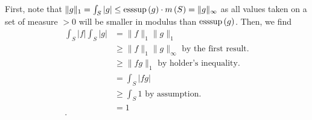 \documentclass[a4paper]{article}
\begin{document}
\newpage
\begin{problem}[41]
First, note that \(\|g\|_{1} = \int_{S} \left|g  \right| \le \operatorname{esssup}\left( g \right) \cdot m\left( S \right)  = \|g\|_{\infty} \) as all values taken on a set of measure \(>0\) will be smaller in modulus than \(\operatorname{esssup}\left( g \right) \). Then, we find
\begin{align*}
	\int_{S} \left| f \right|  \int_{S} \left| g \right| &= \|f\|_{1} \|g\|_{1} \\
							     &\ge \|f\|_{1} \|g\|_{\infty} \text{ by the first result.} \\
							     &\ge \|fg\|_{1} \text{ by holder's inequality.}\\
							     &= \int_{S} \left| fg \right|  \\
							     &\ge \int_{S} 1 \text{ by assumption.}\\
							     &= 1 \\
.\end{align*}
\end{problem}
\newpage
\end{document}
